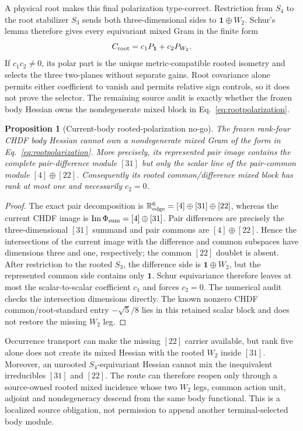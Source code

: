 \documentclass[11pt]{article}
\newtheorem{proposition}{Proposition}
\begin{document}
A physical root makes this final polarization type-correct. Restriction from
$S_4$ to the root stabilizer $S_3$ sends both three-dimensional sides to
$\mathbf1\oplus W_2$. Schur's lemma therefore gives every equivariant mixed
Gram in the finite form
\begin{equation}
 C_{\rm root}=c_1P_{\mathbf1}+c_2P_{W_2}.
 \label{eq:rootpolarization}
\end{equation}
If $c_1c_2\ne0$, its polar part is the unique metric-compatible rooted
isometry and selects the three two-planes without separate gains. Root
covariance alone permits either coefficient to vanish and permits relative
sign controls, so it does not prove the selector. The remaining source audit
is exactly whether the frozen body Hessian owns the nondegenerate mixed block
in Eq.~\eqref{eq:rootpolarization}.

\begin{proposition}[Current-body rooted-polarization no-go]
\label{prop:currentrootgramnogo}
The frozen rank-four CHDF body Hessian cannot own a nondegenerate mixed Gram
of the form in Eq.~\eqref{eq:rootpolarization}. More precisely, its represented
pair image contains the complete pair-difference module $[31]$ but only the
scalar line of the pair-common module $[4]\oplus[22]$. Consequently its
rooted common/difference mixed block has rank at most one and necessarily
$c_2=0$.
\end{proposition}

\begin{proof}
The exact pair decomposition is
$\mathbb R^6_{\rm edge}=[4]\oplus[31]\oplus[22]$, whereas the current CHDF
image is $\operatorname{Im}\Phi_{\rm sum}=[4]\oplus[31]$. Pair differences
are precisely the three-dimensional $[31]$ summand and pair commons are
$[4]\oplus[22]$. Hence the intersections of the current image with the
difference and common subspaces have dimensions three and one, respectively;
the common $[22]$ doublet is absent. After restriction to the rooted $S_3$,
the difference side is $\mathbf1\oplus W_2$, but the represented common side
contains only $\mathbf1$. Schur equivariance therefore leaves at most the
scalar-to-scalar coefficient $c_1$ and forces $c_2=0$. The numerical audit
checks the intersection dimensions directly. The known nonzero CHDF
common/root-standard entry $-\sqrt5/8$ lies in this retained scalar block and
does not restore the missing $W_2$ leg.
\end{proof}

Occurrence transport can make the missing $[22]$ carrier available, but rank
five alone does not create its mixed Hessian with the rooted $W_2$ inside
$[31]$. Moreover, an unrooted $S_4$-equivariant Hessian cannot mix the
inequivalent irreducibles $[31]$ and $[22]$. The route can therefore reopen
only through a source-owned rooted mixed incidence whose two $W_2$ legs,
common action unit, adjoint and nondegeneracy descend from the same body
functional. This is a localized source obligation, not permission to append
another terminal-selected body module.
\end{document}
